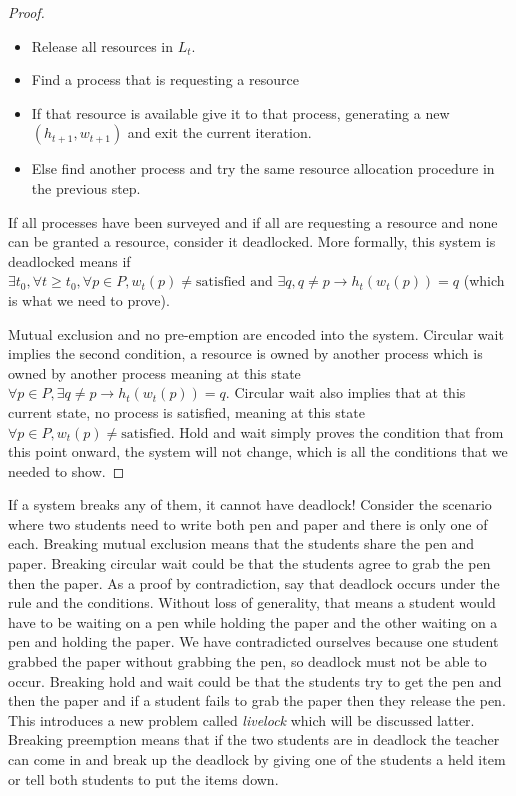 \begin{proof}
\begin{itemize}
\item Release all resources in $L_t$.
\item Find a process that is requesting a resource
\item If that resource is available give it to that process, generating a new $(h_{t+1}, w_{t+1})$ and exit the current iteration.
\item Else find another process and try the same resource allocation procedure in the previous step.
\end{itemize}

If all processes have been surveyed and if all are requesting a resource and none can be granted a resource, consider it deadlocked.
More formally, this system is deadlocked means if $\exists t_0, \forall t \geq t_0, \forall p \in P, w_t(p) \neq \text{satisfied} \text{ and } \exists q, q \neq p \rightarrow h_t(w_t(p)) = q$ (which is what we need to prove).

Mutual exclusion and no pre-emption are encoded into the system.
Circular wait implies the second condition, a resource is owned by another process which is owned by another process meaning at this state $\forall p \in P, \exists q \neq p \rightarrow h_t(w_t(p)) = q$.
Circular wait also implies that at this current state, no process is satisfied, meaning at this state $\forall p \in P, w_t(p) \neq \text{satisfied}$.
Hold and wait simply proves the condition that from this point onward, the system will not change, which is all the conditions that we needed to show.
\end{proof}

If a system breaks any of them, it cannot have deadlock!
Consider the scenario where two students need to write both pen and paper and there is only one of each.
Breaking mutual exclusion means that the students share the pen and paper.
Breaking circular wait could be that the students agree to grab the pen then the paper.
As a proof by contradiction, say that deadlock occurs under the rule and the conditions.
Without loss of generality, that means a student would have to be waiting on a pen while holding the paper and the other waiting on a pen and holding the paper.
We have contradicted ourselves because one student grabbed the paper without grabbing the pen, so deadlock must not be able to occur.
Breaking hold and wait could be that the students try to get the pen and then the paper and if a student fails to grab the paper then they release the pen.
This introduces a new problem called \textit{livelock} which will be discussed latter.
Breaking preemption means that if the two students are in deadlock the teacher can come in and break up the deadlock by giving one of the students a held item or tell both students to put the items down.

